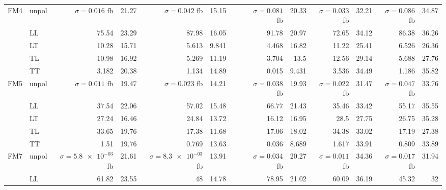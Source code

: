 \begin{table}[H]
{\begin{tabular}{llrrrrrrrrrrrr}
\midrule
\multirow{5}{*}{FM4}
 & unpol & $\sigma = \num{0.016}$ fb & \num{21.27} & $\sigma = \num{0.042}$ fb & \num{15.15} &  &  & $\sigma = \num{0.081}$ fb & \num{20.33} & $\sigma = \num{0.033}$ fb & \num{32.21} & $\sigma = \num{0.086}$ fb & \num{34.87} \\
 & LL & \num{75.54} & \num{23.29} & \num{87.98} & \num{16.05} &  &  & \num{91.78} & \num{20.97} & \num{72.65} & \num{34.12} & \num{86.38} & \num{36.26} \\
 & LT & \num{10.28} & \num{15.71} & \num{5.613} & \num{9.841} &  &  & \num{4.468} & \num{16.82} & \num{11.22} & \num{25.41} & \num{6.526} & \num{26.36} \\
 & TL & \num{10.98} & \num{16.92} & \num{5.269} & \num{11.19} &  &  & \num{3.704} & \num{13.5} & \num{12.56} & \num{29.14} & \num{5.688} & \num{27.76} \\
 & TT & \num{3.182} & \num{20.38} & \num{1.134} & \num{14.89} &  &  & \num{0.015} & \num{9.431} & \num{3.536} & \num{34.49} & \num{1.186} & \num{35.82} \\
\midrule
\multirow{5}{*}{FM5}
 & unpol & $\sigma = \num{0.011}$ fb & \num{19.47} & $\sigma = \num{0.023}$ fb & \num{14.21} &  &  & $\sigma = \num{0.038}$ fb & \num{19.93} & $\sigma = \num{0.022}$ fb & \num{31.47} & $\sigma = \num{0.047}$ fb & \num{33.76} \\
 & LL & \num{37.54} & \num{22.06} & \num{57.02} & \num{15.48} &  &  & \num{66.77} & \num{21.43} & \num{35.46} & \num{33.42} & \num{55.17} & \num{35.55} \\
 & LT & \num{27.24} & \num{16.46} & \num{24.84} & \num{13.72} &  &  & \num{16.12} & \num{16.95} & \num{28.5} & \num{27.75} & \num{26.75} & \num{35.28} \\
 & TL & \num{33.65} & \num{19.76} & \num{17.38} & \num{11.68} &  &  & \num{17.06} & \num{18.02} & \num{34.38} & \num{33.02} & \num{17.19} & \num{27.38} \\
 & TT & \num{1.51} & \num{19.76} & \num{0.769} & \num{13.63} &  &  & \num{0.036} & \num{8.689} & \num{1.617} & \num{33.91} & \num{0.809} & \num{33.89} \\
\midrule
\multirow{5}{*}{FM7}
 & unpol & $\sigma = \num{5.8e-03}$ fb & \num{21.61} & $\sigma = \num{8.3e-03}$ fb & \num{13.91} &  &  & $\sigma = \num{0.034}$ fb & \num{20.27} & $\sigma = \num{0.011}$ fb & \num{34.36} & $\sigma = \num{0.017}$ fb & \num{31.94} \\
 & LL & \num{61.82} & \num{23.55} & \num{48} & \num{14.78} &  &  & \num{78.95} & \num{21.02} & \num{60.09} & \num{36.19} & \num{45.32} & \num{32} \\

\end{tabular}}
\end{table}
